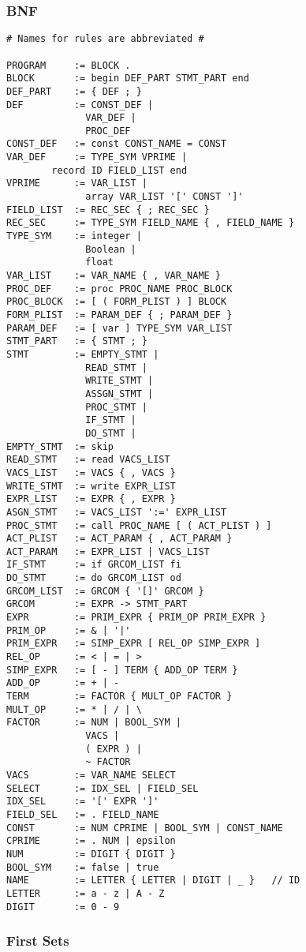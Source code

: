 \documentclass{article}
\begin{document}
\subsubsection{BNF}

\begin{verbatim}
# Names for rules are abbreviated #

PROGRAM     := BLOCK .
BLOCK       := begin DEF_PART STMT_PART end
DEF_PART    := { DEF ; }
DEF         := CONST_DEF |
              VAR_DEF |
              PROC_DEF
CONST_DEF   := const CONST_NAME = CONST
VAR_DEF     := TYPE_SYM VPRIME |
        record ID FIELD_LIST end
VPRIME      := VAR_LIST |
              array VAR_LIST '[' CONST ']'
FIELD_LIST  := REC_SEC { ; REC_SEC }
REC_SEC     := TYPE_SYM FIELD_NAME { , FIELD_NAME }
TYPE_SYM    := integer |
              Boolean |
              float
VAR_LIST    := VAR_NAME { , VAR_NAME }
PROC_DEF    := proc PROC_NAME PROC_BLOCK
PROC_BLOCK  := [ ( FORM_PLIST ) ] BLOCK
FORM_PLIST  := PARAM_DEF { ; PARAM_DEF }
PARAM_DEF   := [ var ] TYPE_SYM VAR_LIST
STMT_PART   := { STMT ; }
STMT        := EMPTY_STMT |
              READ_STMT |
              WRITE_STMT |
              ASSGN_STMT |
              PROC_STMT |
              IF_STMT |
              DO_STMT |
EMPTY_STMT  := skip
READ_STMT   := read VACS_LIST
VACS_LIST   := VACS { , VACS }
WRITE_STMT  := write EXPR_LIST
EXPR_LIST   := EXPR { , EXPR }
ASGN_STMT   := VACS_LIST ':=' EXPR_LIST
PROC_STMT   := call PROC_NAME [ ( ACT_PLIST ) ]
ACT_PLIST   := ACT_PARAM { , ACT_PARAM }
ACT_PARAM   := EXPR_LIST | VACS_LIST
IF_STMT     := if GRCOM_LIST fi
DO_STMT     := do GRCOM_LIST od
GRCOM_LIST  := GRCOM { '[]' GRCOM }
GRCOM       := EXPR -> STMT_PART
EXPR        := PRIM_EXPR { PRIM_OP PRIM_EXPR }
PRIM_OP     := & | '|'
PRIM_EXPR   := SIMP_EXPR [ REL_OP SIMP_EXPR ]
REL_OP      := < | = | >
SIMP_EXPR   := [ - ] TERM { ADD_OP TERM }
ADD_OP      := + | -
TERM        := FACTOR { MULT_OP FACTOR }
MULT_OP     := * | / | \
FACTOR      := NUM | BOOL_SYM |
              VACS |
              ( EXPR ) |
              ~ FACTOR
VACS        := VAR_NAME SELECT
SELECT      := IDX_SEL | FIELD_SEL
IDX_SEL     := '[' EXPR ']'
FIELD_SEL   := . FIELD_NAME
CONST       := NUM CPRIME | BOOL_SYM | CONST_NAME
CPRIME      := . NUM | epsilon
NUM         := DIGIT { DIGIT }
BOOL_SYM    := false | true
NAME        := LETTER { LETTER | DIGIT | _ }   // ID
LETTER      := a - z | A - Z
DIGIT       := 0 - 9
\end{verbatim}

\subsubsection{First Sets}
\end{document}
